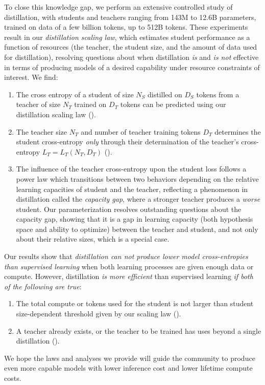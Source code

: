 To close this knowledge gap,
we perform an extensive controlled study of distillation,
with students and teachers ranging from 143M to 12.6B parameters,
trained on data of a few billion tokens, up to 512B tokens.
These experiments result in our \emph{distillation scaling law},
which estimates student performance as a function of resources (the teacher, the student size, and the amount of data used for distillation),
resolving questions about when distillation \emph{is} and \emph{is not} effective in terms of producing models of a desired capability under resource constraints of interest.
We find:
\begin{enumerate}
    \item The cross entropy of a student of size $N_S$ distilled on $D_S$ tokens from a teacher of size $N_T$ trained on $D_T$ tokens can be predicted using our distillation scaling law ().
    \item The teacher size $N_T$ and number of teacher training tokens $D_T$ determines the student cross-entropy \emph{only} through their determination of the teacher's cross-entropy $L_T=L_T(N_T,D_T)$ ().
        \item The influence of the teacher cross-entropy upon the student loss follows a power law which transitions between two behaviors depending on the relative learning capacities of student and the teacher, reflecting a phenomenon in distillation called the \emph{capacity gap},
        where a stronger teacher produces a \emph{worse} student.
        Our parameterization resolves outstanding questions about the capacity gap, showing that it is a gap in learning capacity (both hypothesis space and ability to optimize) between the teacher and student, and not only about their relative sizes, which is a special case.
\end{enumerate}
Our results show that \emph{distillation can not produce lower model cross-entropies than supervised learning} when both learning processes are given enough data or compute.
However, distillation \emph{is more efficient} than supervised learning \emph{if both of the following are true}:
\begin{enumerate}
    \item The total compute or tokens used for the student is not larger than student size-dependent threshold given by our scaling law ().
    \item A teacher already exists, or the teacher to be trained has uses beyond a single distillation ().
\end{enumerate}


We hope the laws and analyses we provide will guide the community to produce even more capable models with lower inference cost and lower lifetime compute costs.



